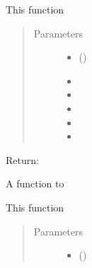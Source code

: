 \documentclass[letterpaper,10pt,english,openany,oneside]{sphinxmanual}
\begin{document}
\begin{fulllineitems}
\begin{fulllineitems}
This function
\begin{quote}\begin{description}
\item[{Parameters}] \leavevmode\begin{itemize}
\item {} 
\sphinxstyleliteralstrong{\sphinxupquote{(}}\sphinxstyleliteralstrong{\sphinxupquote{)}} () \textendash{} 

\item {} 
\sphinxstyleliteralstrong{\sphinxupquote{(}}\sphinxstyleliteralstrong{\sphinxupquote{)}} \textendash{} 

\item {} 
\sphinxstyleliteralstrong{\sphinxupquote{(}}\sphinxstyleliteralstrong{\sphinxupquote{)}} \textendash{} 

\item {} 
\sphinxstyleliteralstrong{\sphinxupquote{(}}\sphinxstyleliteralstrong{\sphinxupquote{)}} \textendash{} 

\item {} 
\sphinxstyleliteralstrong{\sphinxupquote{(}}\sphinxstyleliteralstrong{\sphinxupquote{)}} \textendash{} 

\item {} 
\sphinxstyleliteralstrong{\sphinxupquote{(}}\sphinxstyleliteralstrong{\sphinxupquote{)}} \textendash{} 

\end{itemize}

\end{description}\end{quote}

Return:

\end{fulllineitems}


\begin{fulllineitems}
\label{\detokenize{nloed:nloed.design.Design.__discrete_settup}}
A function to

This function
\begin{quote}\begin{description}
\item[{Parameters}] \leavevmode\begin{itemize}
\item {} 
\sphinxstyleliteralstrong{\sphinxupquote{(}}\sphinxstyleliteralstrong{\sphinxupquote{)}} () \textendash{} 


\end{itemize}
\end{description}
\end{quote}
\end{fulllineitems}
\end{fulllineitems}
\end{document}
